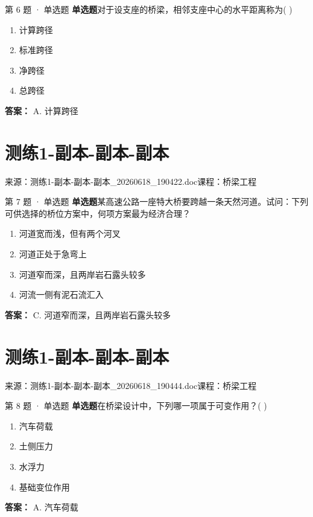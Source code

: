 \documentclass[UTF8,zihao=-4,openany]{ctexbook}
\newenvironment{choices}{\begin{enumerate}[label=\Alph*.,leftmargin=9mm,labelsep=3mm,itemsep=2pt,topsep=4pt]}{\end{enumerate}}
\newcommand{\qtype}[1]{\textcolor{brand}{\sffamily\bfseries #1}}
\newcommand{\sourcefile}[1]{\textcolor{muted}{\small\sffamily 来源：#1}}
\begin{document}
\begin{questionbox}{第 6 题 · 单选题}
\qtype{单选题}\quad 对于设支座的桥梁，相邻支座中心的水平距离称为( )
\begin{choices}
\item 计算跨径
\item 标准跨径
\item 净跨径
\item 总跨径
\end{choices}
\begin{answerbox}
\textbf{答案：} A. 计算跨径
\end{answerbox}
\end{questionbox}

\chapter{测练1-副本-副本-副本}

\sourcefile{测练1-副本-副本-副本\_20260618\_190422.doc}\quad \textcolor{muted}{\small\sffamily 课程：桥梁工程}

\begin{questionbox}{第 7 题 · 单选题}
\qtype{单选题}\quad 某高速公路一座特大桥要跨越一条天然河道。试问：下列可供选择的桥位方案中，何项方案最为经济合理？
\begin{choices}
\item 河道宽而浅，但有两个河叉
\item 河道正处于急弯上
\item 河道窄而深，且两岸岩石露头较多
\item 河流一侧有泥石流汇入
\end{choices}
\begin{answerbox}
\textbf{答案：} C. 河道窄而深，且两岸岩石露头较多
\end{answerbox}
\end{questionbox}

\chapter{测练1-副本-副本-副本}

\sourcefile{测练1-副本-副本-副本\_20260618\_190444.doc}\quad \textcolor{muted}{\small\sffamily 课程：桥梁工程}

\begin{questionbox}{第 8 题 · 单选题}
\qtype{单选题}\quad 在桥梁设计中，下列哪一项属于可变作用？( )
\begin{choices}
\item 汽车荷载
\item 土侧压力
\item 水浮力
\item 基础变位作用
\end{choices}
\begin{answerbox}
\textbf{答案：} A. 汽车荷载
\end{answerbox}
\end{questionbox}
\end{document}
